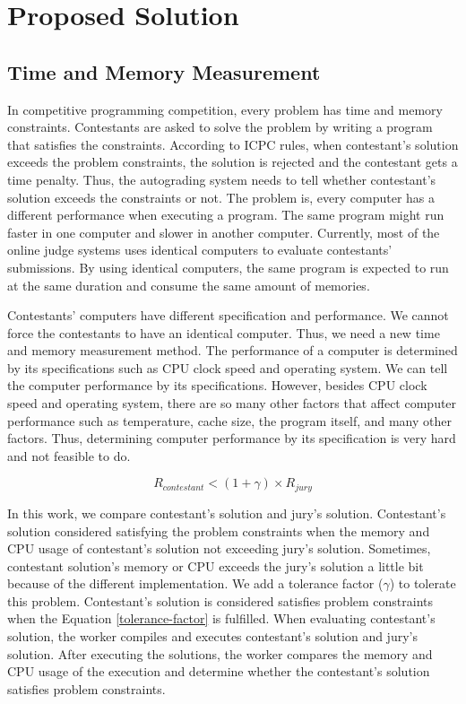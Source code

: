 \documentclass[conference,a4paper]{IEEEtran}
\begin{document}
\section{Proposed Solution}

\subsection{Time and Memory Measurement}

In competitive programming competition, every problem has time and memory constraints. Contestants are asked to solve the problem by writing a program that satisfies the constraints. According to ICPC rules, when contestant's solution exceeds the problem constraints, the solution is rejected and the contestant gets a time penalty. Thus, the autograding system needs to tell whether contestant's solution exceeds the constraints or not. The problem is, every computer has a different performance when executing a program. The same program might run faster in one computer and slower in another computer. Currently, most of the online judge systems uses identical computers to evaluate contestants' submissions. By using identical computers, the same program is expected to run at the same duration and consume the same amount of memories.

Contestants' computers have different specification and performance. We cannot force the contestants to have an identical computer. Thus, we need a new time and memory measurement method. The performance of a computer is determined by its specifications such as CPU clock speed and operating system. We can tell the computer performance by its specifications. However, besides CPU clock speed and operating system, there are so many other factors that affect computer performance such as temperature, cache size, the program itself, and many other factors. Thus, determining computer performance by its specification is very hard and not feasible to do.

\begin{equation}\label{tolerance-factor}
R_{contestant} < (1 + \gamma) \times R_{jury}
\end{equation}

In this work, we compare contestant's solution and jury's solution. Contestant's solution considered satisfying the problem constraints when the memory and CPU usage of contestant's solution not exceeding jury's solution. Sometimes, contestant solution's memory or CPU exceeds the jury's solution a little bit because of the different implementation. We add a tolerance factor ($\gamma$) to tolerate this problem. Contestant's solution is considered satisfies problem constraints when the Equation \ref{tolerance-factor} is fulfilled. When evaluating contestant's solution, the worker compiles and executes contestant's solution and jury's solution. After executing the solutions, the worker compares the memory and CPU usage of the execution and determine whether the contestant's solution satisfies problem constraints. 
\end{document}
